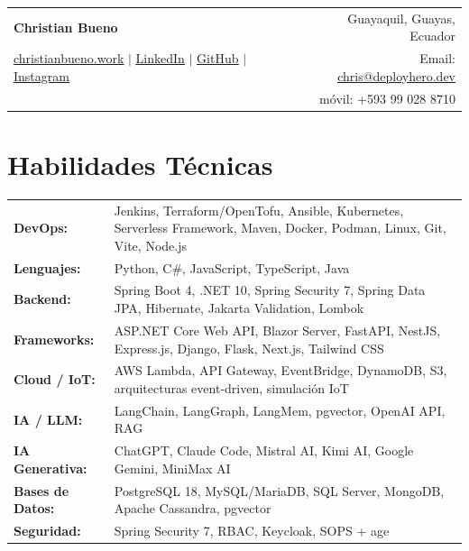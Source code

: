 \documentclass[a4paper,11pt]{article}
\newcommand{\name}[1]{\textbf{\Huge #1}}
\newcommand{\socialLinks}[1]{#1}
\newcommand{\separator}{$|$}
\begin{document}

\begin{tabular*}{\textwidth}{l@{\extracolsep{\fill}}r}
  \name{Christian Bueno \vspace{2pt}} &
  Guayaquil, Guayas, Ecuador \\

  \socialLinks{
    \href{https://www.christianbueno.work}{\uline{christianbueno.work}} \separator{}
    \href{https://www.linkedin.com/in/christianbueno1/}{\uline{LinkedIn}} \separator{}
    \href{https://github.com/christianbueno1}{\uline{GitHub}} \separator{}
    \href{https://www.instagram.com/christianbueno.1/}{\uline{Instagram}}
  } &
  Email: \href{mailto:chris@deployhero.dev}{\uline{chris@deployhero.dev}} \\

  & móvil: +593 99 028 8710 \\
\end{tabular*}


\section{Habilidades Técnicas}
\begin{tabular}{@{}p{3.2cm}>{\raggedright\arraybackslash}p{12.8cm}@{}}
  \textbf{DevOps:}         & Jenkins, Terraform/OpenTofu, Ansible, Kubernetes, Serverless Framework, Maven, Docker, Podman, Linux, Git, Vite, Node.js \\
  \textbf{Lenguajes:}      & Python, C\#, JavaScript, TypeScript, Java                                                     \\
  \textbf{Backend:}        & Spring Boot 4, .NET 10, Spring Security 7, Spring Data JPA, Hibernate, Jakarta Validation, Lombok \\
  \textbf{Frameworks:}     & ASP.NET Core Web API, Blazor Server, FastAPI, NestJS, Express.js, Django, Flask, Next.js, Tailwind CSS \\
  \textbf{Cloud / IoT:}    & AWS Lambda, API Gateway, EventBridge, DynamoDB, S3, arquitecturas event-driven, simulación IoT \\
  \textbf{IA / LLM:}       & LangChain, LangGraph, LangMem, pgvector, OpenAI API, RAG                                      \\
  \textbf{IA Generativa:}  & ChatGPT, Claude Code, Mistral AI, Kimi AI, Google Gemini, MiniMax AI                            \\
  \textbf{Bases de Datos:} & PostgreSQL 18, MySQL/MariaDB, SQL Server, MongoDB, Apache Cassandra, pgvector                  \\
  \textbf{Seguridad:}      & Spring Security 7, RBAC, Keycloak, SOPS + age                                                   \\
\end{tabular}
\end{document}
